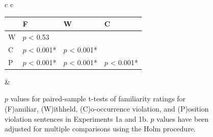 \documentclass[man,floatsintext]{apa6}
\begin{document}
\begin{figure}[h]
\begin{center}
\begin{tabular}{ c c}
{        %




      \small
      \begin{tabular}{| l | l |  l | l |}
        \hline
        & F                            & W                         & C \\
        \hline
        W &  $p$ < 0.53  &                           &\\
        \hline
        C &  $p$ < 0.001*  &  $p$ < 0.001*   &\\
        \hline
        P &  $p$ < 0.001* &  $p$ < 0.001*  &  $p$ < 0.001*\\
        \hline
      \end{tabular}
      } & \\

    \end{tabular}
    \caption{$p$ values for paired-sample t-tests of familiarity ratings for (F)amiliar, (W)ithheld, (C)o-occurrence violation, and (P)osition violation sentences in Experiments 1a and 1b. $p$ values have been adjusted for multiple comparisons using the Holm procedure.}
    \label{familiarity-ordering-t-tests-1a1b}
  \end{center}
\end{figure}
\end{document}

